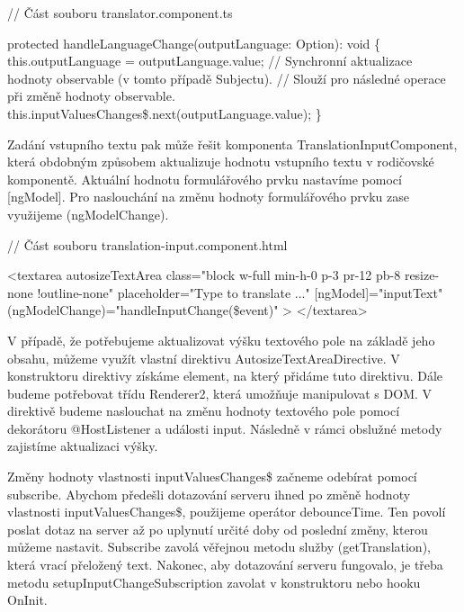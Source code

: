 \begin{prog}
// Část souboru translator.component.ts

protected handleLanguageChange(outputLanguage: Option): void \{
  this.outputLanguage = outputLanguage.value;
  // Synchronní aktualizace hodnoty observable (v tomto případě Subjectu).
  // Slouží pro následné operace při změně hodnoty observable.
  this.inputValuesChanges\$.next(outputLanguage.value);
\}
\end{prog}

Zadání vstupního textu pak může řešit komponenta TranslationInputComponent, která obdobným způsobem aktualizuje hodnotu vstupního textu v rodičovské komponentě. 
Aktuální hodnotu formulářového prvku nastavíme pomocí [ngModel]. Pro naslouchání na změnu hodnoty formulářového prvku zase využijeme (ngModelChange).

\begin{prog}
// Část souboru translation-input.component.html

<textarea
  autosizeTextArea
  class="block w-full min-h-0 p-3 pr-12 pb-8 resize-none !outline-none"
  placeholder="Type to translate ..."
  [ngModel]="inputText"
  (ngModelChange)="handleInputChange(\$event)"
>
</textarea>
\end{prog}

V případě, že potřebujeme aktualizovat výšku textového pole na základě jeho obsahu, můžeme využít vlastní direktivu AutosizeTextAreaDirective. 
V konstruktoru direktivy získáme element, na který přidáme tuto direktivu. Dále budeme potřebovat třídu Renderer2, která umožňuje manipulovat s DOM. 
V direktivě budeme naslouchat na změnu hodnoty textového pole pomocí dekorátoru @HostListener a události input. Následně v rámci obslužné metody zajistíme aktualizaci výšky.
 
Změny hodnoty vlastnosti inputValuesChanges\$ začneme odebírat pomocí subscribe. 
Abychom předešli dotazování serveru ihned po změně hodnoty vlastnosti inputValuesChanges\$, použijeme operátor debounceTime. 
Ten povolí poslat dotaz na server až po uplynutí určité doby od poslední změny, kterou můžeme nastavit. 
Subscribe zavolá věřejnou metodu služby (getTranslation), která vrací přeložený text. 
Nakonec, aby dotazování serveru fungovalo, je třeba metodu setupInputChangeSubscription zavolat v konstruktoru nebo hooku OnInit.

